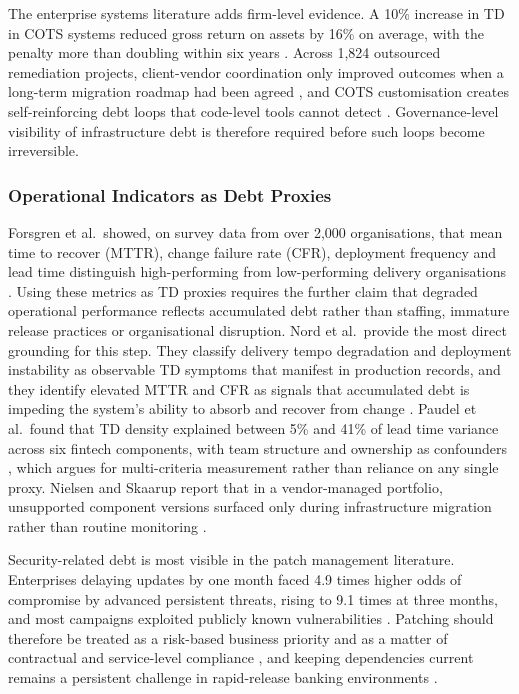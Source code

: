 \documentclass[
  journal,
]{IEEEtran}%
\begin{document}
The enterprise systems literature adds firm-level evidence. A 10\%
increase in TD in COTS systems reduced gross return on assets by 16\% on
average, with the penalty more than doubling within six years
. Across 1,824
outsourced remediation projects, client-vendor coordination only
improved outcomes when a long-term migration roadmap had been agreed
, and COTS
customisation creates self-reinforcing debt loops that code-level tools
cannot detect
.
Governance-level visibility of infrastructure debt is therefore required
before such loops become irreversible.

\subsubsection{Operational Indicators as Debt
Proxies}\label{operational-indicators-as-debt-proxies}

Forsgren et al.~showed, on survey data from over 2,000 organisations,
that mean time to recover (MTTR), change failure rate (CFR), deployment
frequency and lead time distinguish high-performing from low-performing
delivery organisations .
Using these metrics as TD proxies requires the further claim that
degraded operational performance reflects accumulated debt rather than
staffing, immature release practices or organisational disruption. Nord
et al.~provide the most direct grounding for this step. They classify
delivery tempo degradation and deployment instability as observable TD
symptoms that manifest in production records, and they identify elevated
MTTR and CFR as signals that accumulated debt is impeding the system's
ability to absorb and recover from change
. Paudel et
al.~found that TD density explained between 5\% and 41\% of lead time
variance across six fintech components, with team structure and
ownership as confounders
, which
argues for multi-criteria measurement rather than reliance on any single
proxy. Nielsen and Skaarup report that in a vendor-managed portfolio,
unsupported component versions surfaced only during infrastructure
migration rather than routine monitoring
.

Security-related debt is most visible in the patch management
literature. Enterprises delaying updates by one month faced 4.9 times
higher odds of compromise by advanced persistent threats, rising to 9.1
times at three months, and most campaigns exploited publicly known
vulnerabilities
. Patching
should therefore be treated as a risk-based business priority
 and as a
matter of contractual and service-level compliance
, and keeping
dependencies current remains a persistent challenge in rapid-release
banking environments .
\end{document}
